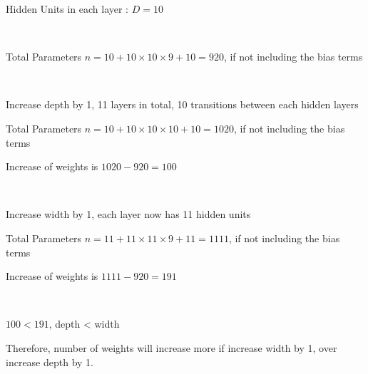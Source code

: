 \documentclass[10pt]{article}
\begin{document}
\noindent  Hidden Units in each layer : $D = 10$

\ 

\noindent Total Parameters $ n = 10 + 10 \times 10 \times 9 + 10 = 920  $, if not including the bias terms

\ 

\noindent Increase depth by 1, 11 layers in total, 10 transitions between each hidden layers

\noindent Total Parameters $ n = 10 + 10 \times 10 \times 10 + 10 = 1020 $, if not including the bias terms

\noindent Increase of weights is $1020-920=100$

\ 

\noindent Increase width by 1, each layer now has 11 hidden units 

\noindent Total Parameters $ n = 11 + 11 \times 11 \times 9  + 11 = 1111 $, if not including the bias terms

\noindent Increase of weights is $1111-920=191$

\ 

\noindent $100 < 191$, depth < width

\noindent  Therefore, number of weights will increase more if increase width by 1, over increase depth by 1. 
\end{document}
